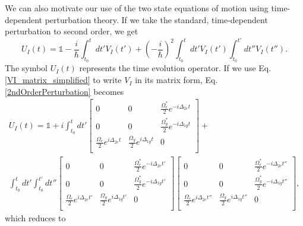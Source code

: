 We can also motivate our use of the two state equations of motion using time-dependent perturbation theory. If we take the standard, time-dependent perturbation to second order, we get
\begin{equation}
U_I(t)=\mathds{1}-\frac{i}{\hbar}\int_{t_0}^t dt' V_I(t') + \left(-\frac{i}{\hbar}\right)^2 \int_{t_0}^t dt' V_I(t')\int_{t_0}^{t'}dt'' V_I(t'').
\label{2ndOrderPerturbation}
\end{equation}
The symbol $U_I(t)$ represents the time evolution operator.
If we use Eq.\,\eqref{VI_matrix_simplified} to write $V_I$ in its matrix form, Eq.\,\eqref{2ndOrderPerturbation} becomes
\begin{multline}
U_I(t)=\mathds{1}+i\int_{t_0}^t dt'
\begin{bmatrix}
0 & 0 & \frac{\Omega_e^*}{2}e^{-i\Delta_{2e}t} \\
0 & 0 & \frac{\Omega_g^*}{2}e^{-i\Delta_{1g}t}\\
\frac{\Omega_e}{2}e^{i\Delta_{2e}t} & \frac{\Omega_{g}}{2}e^{i\Delta_{1g}t} & 0 \\
\end{bmatrix}
+ \\
\int_{t_0}^t dt' 
\int_{t_0}^{t'}dt'' 
\begin{bmatrix}
0 & 0 & \frac{\Omega_e^*}{2}e^{-i\Delta_{2e}t'} \\
0 & 0 & \frac{\Omega_g^*}{2}e^{-i\Delta_{1g}t'}\\
\frac{\Omega_e}{2}e^{i\Delta_{2e}t'} & \frac{\Omega_{g}}{2}e^{i\Delta_{1g}t'} & 0 \\
\end{bmatrix}
\begin{bmatrix}
0 & 0 & \frac{\Omega_e^*}{2}e^{-i\Delta_{2e}t''} \\
0 & 0 & \frac{\Omega_g^*}{2}e^{-i\Delta_{1g}t''}\\
\frac{\Omega_e}{2}e^{i\Delta_{2e}t''} & \frac{\Omega_{g}}{2}e^{i\Delta_{1g}t''} & 0 \\
\end{bmatrix},
\end{multline}
which reduces to 

